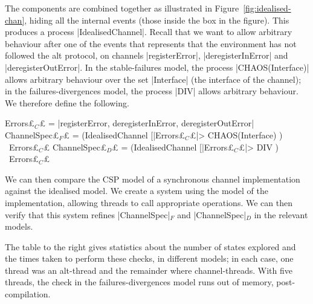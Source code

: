 The components are combined together as illustrated in
Figure~\ref{fig:idealised-chan}, hiding all the internal events (those inside
the box in the figure).  This produces a process |IdealisedChannel|.  Recall
that we want to allow arbitrary behaviour after one of the events that
represents that the environment has not followed the alt protocol, on channels
|registerError|, |deregisterInError| and |deregisterOutError|.  In the
stable-failures model, the process |CHAOS(Interface)| allows arbitrary
behaviour over the set |Interface| (the interface of the channel); in the
failures-divergences model, the process |DIV| allows arbitrary behaviour.  We
therefore define the following.
%
\begin{cspm}
Errors£$_C$£ = {|registerError, deregisterInError, deregisterOutError|}
ChannelSpec£$_F$£ = (IdealisedChannel [|Errors£$_C$£|> CHAOS(Interface) ) \ Errors£$_C$£
ChannelSpec£$_D$£ = (IdealisedChannel [|Errors£$_C$£|> DIV ) \ Errors£$_C$£
\end{cspm}

We can then compare the CSP model of a synchronous channel implementation
against the idealised model.  We create a system using the model of the
implementation, allowing threads to call appropriate operations.  We can then
verify that this system refines |ChannelSpec|$_F$ and |ChannelSpec|$_D$ in the
relevant models.


\begin{window}
%
The table to the right gives statistics about the number of states explored
and the times taken to perform these checks, in different models; in each
case, one thread was an alt-thread and the remainder where channel-threads.
\framebox{***} With five threads, the check in the failures-divergences model
runs out of memory, post-compilation.
\end{window}
 
